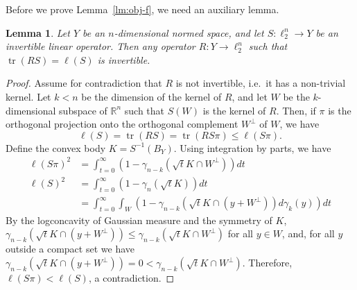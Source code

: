 \documentclass[11pt]{article}
\newtheorem{lemma}{Lemma}
\newcommand{\R}{{\mathbb{R}}}
\DeclareMathOperator{\tr}{tr}
\begin{document}
Before we prove Lemma~\ref{lm:obj-f}, we need an auxiliary lemma.
\begin{lemma}\label{lm:invertible}
  Let $Y$ be an $n$-dimensional normed space, and let $S:\ell_2^n \to
  Y$ be an invertible linear operator. Then any operator $R:Y \to
  \ell_2^n$ such that $\tr(RS) = \ell(S)$ is invertible.
\end{lemma}
\begin{proof}
  Assume for contradiction that $R$ is not invertible, i.e.~it has a
  non-trivial kernel. Let $k<n$ be the dimension of the kernel of $R$,
  and let $W$ be the $k$-dimensional subspace of $\R^n$ such that $S(W)$
  is the kernel of $R$. Then, if $\pi$ is the orthogonal projection onto
  the orthogonal complement $W^\perp$ of $W$, we have
  \[
  \ell(S) = \tr(RS) = \tr(RS\pi) \le \ell(S\pi).
  \]
  Define the convex body $K = S^{-1}(B_Y)$. Using integration by
  parts, we have
  \begin{align*}
  \ell(S\pi)^2 &= \int_{t = 0}^\infty (1-\gamma_{n-k}(\sqrt{t}K\cap W^\perp))dt\\
  \ell(S)^2 &= \int_{t = 0}^\infty (1-\gamma_n(\sqrt{t}K))dt\\
  &= \int_{t = 0}^\infty \int_{W}(1-\gamma_{n-k}(\sqrt{t}K \cap (y + W^\perp))d\gamma_{k}(y))dt
  \end{align*}
  By the logconcavity of Gaussian measure and the symmetry of $K$,
  $\gamma_{n-k}(\sqrt{t}K \cap (y + W^\perp)) \le \gamma_{n-k}(\sqrt{t}K \cap
  W^\perp)$ for all $y \in W$, and, for all $y$ outside a
  compact set we have $\gamma_{n-k}(\sqrt{t}K \cap (y + W^\perp)) = 0 <
  \gamma_{n-k}(\sqrt{t}K \cap W^\perp)$. Therefore, $\ell(S\pi) < \ell(S)$, a
  contradiction.
\end{proof}
\end{document}
